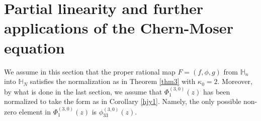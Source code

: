 \documentclass[12pt]{article}
\numberwithin{equation}{section}
\def\BB{{\mathbb B}}
\def\CC{{\mathbb C}}
\def\HH{{\mathbb H}}
\begin{document}



\section{ Partial linearity and further applications
of the Chern-Moser equation}
We  assume in this section that
the proper rational  map $F=(f,\phi,g)$ from ${\HH}_n$ into
${\HH}_{N}$ satisfies the normalization as in Theorem \ref{thm3}
with $\kappa_0=2$. Moreover, by what is done in the last section, we
assume that $\Phi^{(3,0)}_1(z)$ has been normalized to take the form
as in Corollary \ref{hjy1}. Namely, the only possible non-zero
element in $\Phi^{(3,0)}_1(z) $ is $\phi_{33}^{(3,0)}(z) $.
\end{document}
